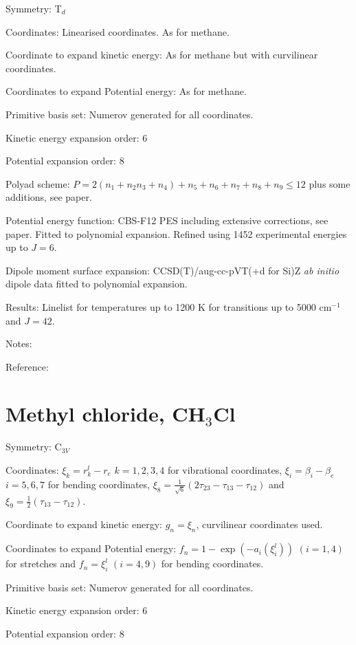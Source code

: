 Symmetry: T$_d$

Coordinates: Linearised coordinates. As for methane.

Coordinate to expand kinetic energy: As for methane but with curvilinear coordinates.

Coordinates to expand Potential energy: As for methane.

Primitive basis set: Numerov generated for all coordinates.

Kinetic energy expansion order: 6

Potential expansion order: 8

Polyad scheme: $P = 2(n_1 + n_2 n_3 + n_4) + n_5 + n_6 + n_7 + n_8 + n_9 \leq 12$ plus some additions, see paper.

Potential energy function: CBS-F12 PES including extensive corrections, see paper. Fitted to polynomial expansion. 
Refined using 1452 experimental energies up to $J = 6$.

Dipole moment surface expansion: CCSD(T)/aug-cc-pVT(+d for Si)Z \textit{ab initio} dipole data fitted to polynomial expansion.

Results: Linelist for temperatures up to 1200 K for transitions up to 5000 cm$^{-1}$ and $J = 42$.

Notes: 

Reference: \cite{jt701}



\section{Methyl chloride, CH$_3$Cl}

Symmetry: C$_{3V}$

Coordinates:  $\xi_k = r_k^l - r_e$ $k = 1,2,3,4$ for vibrational coordinates, 
$\xi_i = \beta_i - \beta_e$ $i = 5,6,7$ for bending coordinates, $\xi_8 = \frac{1}{\sqrt{6}} (2 \tau_{23} -
 \tau_{13} - \tau_{12})$ and $\xi_9 = \frac{1}{2}(\tau_{13} - \tau_{12})$.

Coordinate to expand kinetic energy: $g_n = \xi_n$, curvilinear coordinates used.

Coordinates to expand Potential energy: $f_n = 1 - \exp(-a_i(\xi_i^l))$ $(i = 1, 4)$ for stretches and 
$f_n = \xi_i^l$ $(i = 4, 9)$ for bending coordinates.

Primitive basis set: Numerov generated for all coordinates.

Kinetic energy expansion order: 6

Potential expansion order: 8

